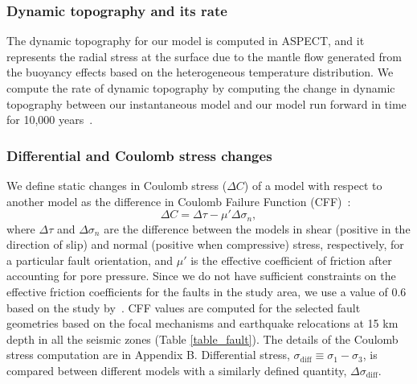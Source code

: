 \documentclass[draft,linenumbers]{agujournal2018}
\begin{document}
\subsubsection{Dynamic topography and its rate}
The dynamic topography for our model is computed in ASPECT, and it represents the radial stress at the surface due to the mantle flow generated from the buoyancy effects based on the heterogeneous temperature distribution. We compute the rate of dynamic topography by computing the change in dynamic topography between our instantaneous model and our model run forward in time for 10,000 years~\citep{becker2015western}.  

\subsubsection{Differential and Coulomb stress changes}
We define static changes in Coulomb stress ($\Delta C$) of a model with respect to another model as the difference in Coulomb Failure Function (CFF)~\citep{king1994static}:
%
\begin{equation} \label{eq4}
    \Delta C = \Delta \tau - \mu' \Delta \sigma_n,
\end{equation}
%
where $\Delta \tau$ and $\Delta\sigma_n$ are the difference between the models in shear (positive in the direction of slip) and normal (positive when compressive) stress, respectively, for a particular fault orientation, and $\mu'$ is the effective coefficient of friction after accounting for pore pressure. Since we do not have sufficient constraints on the effective friction coefficients for the faults in the study area, we use a value of 0.6 based on the study by~\citet{hurd2012intraplate}. CFF values are computed for the selected fault geometries based on the focal mechanisms and earthquake relocations at 15 km depth in all the seismic zones (Table \ref{table_fault}). The details of the Coulomb stress computation are in Appendix B. Differential stress, $\sigma_{\text{diff}} \equiv \sigma_{1}-\sigma_{3}$, is compared between different models with a similarly defined quantity, $\Delta \sigma_{\text{diff}}$.
\end{document}
